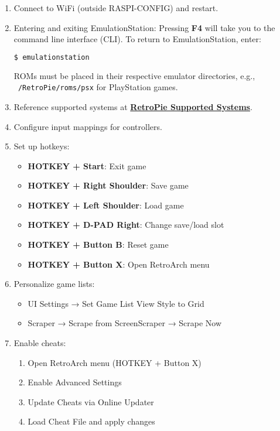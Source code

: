 \begin{enumerate}
    \item Connect to WiFi (outside RASPI-CONFIG) and restart.

    \item Entering and exiting EmulationStation:
    Pressing \textbf{F4} will take you to the command line interface (CLI). To return to EmulationStation, enter:
    \begin{lstlisting}[language=bash, breaklines=true, breakatwhitespace=true, columns=fullflexible]
    $ emulationstation
    \end{lstlisting}
    ROMs must be placed in their respective emulator directories, e.g., \texttt{~/RetroPie/roms/psx} for PlayStation games.
    
    \item Reference supported systems at \href{https://retropie.org.uk/docs/Supported-Systems/}{\textbf{\color{blue}RetroPie Supported Systems}}.
    
    \item Configure input mappings for controllers.
    
    \item Set up hotkeys:
    \begin{itemize}
        \item \textbf{HOTKEY + Start}: Exit game
        \item \textbf{HOTKEY + Right Shoulder}: Save game
        \item \textbf{HOTKEY + Left Shoulder}: Load game
        \item \textbf{HOTKEY + D-PAD Right}: Change save/load slot
        \item \textbf{HOTKEY + Button B}: Reset game
        \item \textbf{HOTKEY + Button X}: Open RetroArch menu
    \end{itemize}
    
    \item Personalize game lists:
    \begin{itemize}
        \item UI Settings → Set Game List View Style to Grid
        \item Scraper → Scrape from ScreenScraper → Scrape Now
    \end{itemize}
    
    \item Enable cheats:
    \begin{enumerate}
        \item Open RetroArch menu (HOTKEY + Button X)
        \item Enable Advanced Settings
        \item Update Cheats via Online Updater
        \item Load Cheat File and apply changes
    \end{enumerate}


\end{enumerate}

